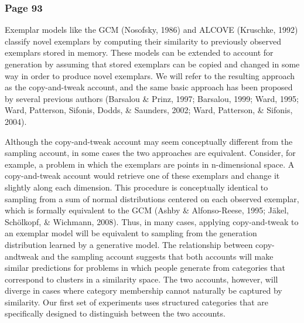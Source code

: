\documentclass[12pt]{article} \usepackage[letterpaper, margin=1in,
\begin{document}
\subsubsection{Page 93}
\begin{displayquote} Exemplar models like the GCM (Nosofsky, 1986) and ALCOVE
(Kruschke, 1992) classify novel exemplars by computing their similarity to
previously observed exemplars stored in memory. These models can be extended to
account for generation by assuming that stored exemplars can be copied and
changed in some way in order to produce novel exemplars. We will refer to the
resulting approach as the copy-and-tweak account, and the same basic approach
has been proposed by several previous authors (Barsalou \& Prinz, 1997;
Barsalou, 1999; Ward, 1995; Ward, Patterson, Sifonis, Dodds, \& Saunders, 2002;
Ward, Patterson, \& Sifonis, 2004).

Although the copy-and-tweak account may seem conceptually different from the
sampling account, in some cases the two approaches are equivalent. Consider, for
example, a problem in which the exemplars are points in n-dimensional space. A
copy-and-tweak account would retrieve one of these exemplars and change it
slightly along each dimension. This procedure is conceptually identical to
sampling from a sum of normal distributions centered on each observed exemplar,
which is formally equivalent to the GCM (Ashby \& Alfonso-Reese, 1995; Jäkel,
Schölkopf, \& Wichmann, 2008). Thus, in many cases, applying copy-and-tweak to
an exemplar model will be equivalent to sampling from the generation
distribution learned by a generative model. The relationship between
copy-andtweak and the sampling account suggests that both accounts will make
similar predictions for problems in which people generate from categories that
correspond to clusters in a similarity space. The two accounts, however, will
diverge in cases where category membership cannot naturally be captured by
similarity. Our first set of experiments uses structured categories that are
specifically designed to distinguish between the two accounts.
\end{displayquote}
\end{document}
